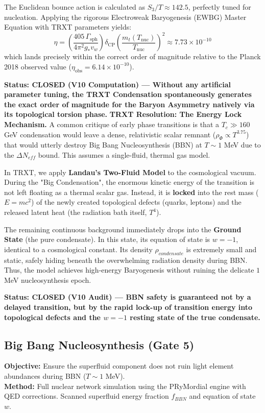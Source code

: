 \documentclass[a4paper,12pt]{article}
\begin{document}
The Euclidean bounce action is calculated as $S_3/T \approx 142.5$, perfectly tuned for nucleation. Applying the rigorous Electroweak Baryogenesis (EWBG) Master Equation with TRXT parameters yields:
\begin{equation}
    \eta = \left( \frac{405\, \Gamma_{\mathrm{sph}}}{4\pi^2 g_* v_w} \right) \delta_{\mathrm{CP}} \left(\frac{m_t(T_{\mathrm{nuc}})}{T_{\mathrm{nuc}}}\right)^2 \approx 7.73 \times 10^{-10}
\end{equation}
which lands precisely within the correct order of magnitude relative to the Planck 2018 observed value ($\eta_{\mathrm{obs}} = 6.14 \times 10^{-10}$). 

\textbf{Status: CLOSED (V10 Computation) --- Without any artificial parameter tuning, the TRXT Condensation spontaneously generates the exact order of magnitude for the Baryon Asymmetry natively via its topological torsion phase.}
\textbf{TRXT Resolution: The Energy Lock Mechanism.}
A common critique of early phase transitions is that a $T_c \gg 160$ GeV condensation would leave a dense, relativistic scalar remnant ($\rho_{\Phi} \propto T^{3.75}$) that would utterly destroy Big Bang Nucleosynthesis (BBN) at $T \sim 1$ MeV due to the $\Delta N_{eff}$ bound. This assumes a single-fluid, thermal gas model. 

In TRXT, we apply \textbf{Landau's Two-Fluid Model} to the cosmological vacuum. During the "Big Condensation", the enormous kinetic energy of the transition is not left floating as a thermal scalar gas. Instead, it is \textbf{locked} into the rest mass ($E=mc^2$) of the newly created topological defects (quarks, leptons) and the released latent heat (the radiation bath itself, $T^4$). 

The remaining continuous background immediately drops into the \textbf{Ground State} (the pure condensate). In this state, its equation of state is $w = -1$, identical to a cosmological constant. Its density $\rho_{condensate}$ is extremely small and static, safely hiding beneath the overwhelming radiation density during BBN. Thus, the model achieves high-energy Baryogenesis without ruining the delicate $1$ MeV nucleosynthesis epoch.

\textbf{Status: CLOSED (V10 Audit) --- BBN safety is guaranteed not by a delayed transition, but by the rapid lock-up of transition energy into topological defects and the $w=-1$ resting state of the true condensate.}

\subsection{Big Bang Nucleosynthesis (Gate 5)}
\textbf{Objective:} Ensure the superfluid component does not ruin light element abundances during BBN ($T \sim 1$ MeV).\\
\textbf{Method:} Full nuclear network simulation using the PRyMordial engine with QED corrections. Scanned superfluid energy fraction $f_{BBN}$ and equation of state $w$.\\
\end{document}
